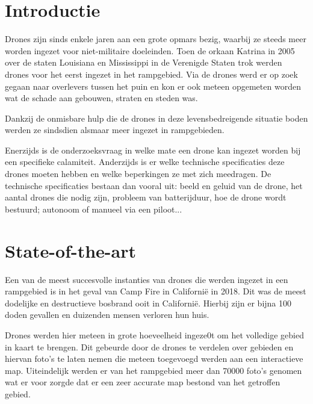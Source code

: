
\section{Introductie} %
\label{sec:introductie}

Drones zijn sinds enkele jaren aan een grote opmars bezig, waarbij ze steeds meer worden ingezet voor niet-militaire doeleinden. Toen de orkaan Katrina in 2005 over de staten Louisiana en Mississippi in de Verenigde Staten trok werden drones voor het eerst ingezet in het rampgebied. \autocite{Murphy2015} Via de drones werd er op zoek gegaan naar overlevers tussen het puin en kon er ook meteen opgemeten worden wat de schade aan gebouwen, straten en steden was.

Dankzij de onmisbare hulp die de drones in deze levensbedreigende  situatie boden werden ze sindsdien alsmaar meer ingezet in rampgebieden. 

Enerzijds is de onderzoeksvraag in welke mate een drone kan ingezet worden bij een specifieke calamiteit. Anderzijds is er welke technische specificaties deze drones moeten hebben en welke beperkingen ze met zich meedragen. De technische specificaties bestaan dan vooral uit: beeld en geluid van de drone, het aantal drones die nodig zijn, probleem van batterijduur, hoe de drone wordt bestuurd; autonoom of manueel via een piloot...


\section{State-of-the-art}
\label{sec:state-of-the-art}

Een van de meest succesvolle instanties van drones die werden ingezet in een rampgebied is in het geval van Camp Fire in Californië in 2018. Dit was de meest dodelijke en destructieve bosbrand ooit in Californië. Hierbij zijn er bijna 100 doden gevallen en duizenden mensen verloren hun huis.

Drones werden hier meteen in grote hoeveelheid ingeze0t om het volledige gebied in kaart te brengen. Dit gebeurde door de drones te verdelen over gebieden en hiervan foto's te laten nemen die meteen toegevoegd werden aan een interactieve map. Uiteindelijk werden er van het rampgebied meer dan 70000 foto's genomen wat er voor zorgde dat er een zeer accurate map bestond van het getroffen gebied. \autocite{Reagan2019}

